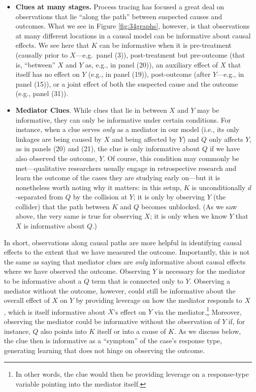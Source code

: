\documentclass[12pt,]{book}
\let\rmarkdownfootnote\footnote%
\def\footnote{\protect\rmarkdownfootnote}
\begin{document}
\begin{itemize}
\item
  \textbf{Clues at many stages.} Process tracing has focused a great deal on observations that lie ``along the path'' between suspected causes and outcomes. What we see in Figure \ref{fig:34graphs}, however, is that observations at many different locations in a causal model can be informative about causal effects. We see here that \(K\) can be informative when it is pre-treatment (causally prior to \(X\)---e.g.~panel (3)), post-treatment but pre-outcome (that is, ``between'' \(X\) and \(Y\) as, e.g., in panel (20)), an auxiliary effect of \(X\) that itself has no effect on \(Y\) (e.g., in panel (19)), post-outcome (after \(Y\)---e.g., in panel (15)), or a joint effect of both the suspected cause and the outcome (e.g., panel (31)).
\item
  \textbf{Mediator Clues}. While clues that lie in between \(X\) and \(Y\) may be informative, they can only be informative under certain conditions. For instance, when a clue serves \emph{only} as a mediator in our model (i.e., its only linkages are being caused by \(X\) and being affected by \(Y\)) and \(Q\) only affects \(Y\), as in panels (20) and (21), the clue is only informative about \(Q\) if we have also observed the outcome, \(Y\). Of course, this condition may commonly be met---qualitative researchers usually engage in retrospective research and learn the outcome of the cases they are studying early on---but it is nonetheless worth noting why it matters: in this setup, \(K\) is unconditionally \(d\)-separated from \(Q\) by the collision at \(Y\); it is only by observing \(Y\) (the collider) that the path between \(K\) and \(Q\) becomes unblocked. (As we saw above, the very same is true for observing \(X\); it is only when we know \(Y\) that \(X\) is informative about \(Q\).)
\end{itemize}

In short, observations along causal paths are more helpful in identifying causal effects to the extent that we have measured the outcome. Importantly, this is not the same as saying that mediator clues are \emph{only} informative about causal effects where we have observed the outcome. Observing \(Y\) is necessary for the mediator to be informative about a \(Q\) term that is connected only to \(Y\). Observing a mediator without the outcome, however, could still be informative about the overall effect of \(X\) on \(Y\) by providing leverage on how the mediator responds to \(X\), which is itself informative about \(X\)'s effect on \(Y\) via the mediator.\footnote{In other words, the clue would then be providing leverage on a response-type variable pointing into the mediator itself.} Moreover, observing the mediator could be informative without the observation of \(Y\) if, for instance, \(Q\) also points into \(K\) itself or into a cause of \(K\). As we discuss below, the clue then is informative as a ``symptom'' of the case's response type, generating learning that does not hinge on observing the outcome.
\end{document}
